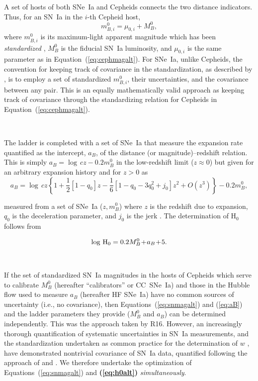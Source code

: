 \documentclass[12pt]{aastex631}
\newcommand{\bq}{\begin{equation}}
\newcommand{\eq}{\end{equation}}
\begin{document}
A set of hosts of both SNe~Ia and Cepheids connects the two distance indicators. Thus, for an SN~Ia in the $i$-th Cepheid host, 
\bq m_{B,i}^0=\mu_{0,i}\!+\!M_B^0, \label{eq:snmagalt} \eq
\noindent where $m_{B,i}^0$ is its maximum-light apparent magnitude which has been {\it standardized} \citep[i.e., corrected for variations around the fiducial color, luminosity, and any host dependence; see][]{Scolnic:2021}, $M_B^0$ is the fiducial SN~Ia luminosity, and $\mu_{0,i}$ is the same parameter as in Equation~(\ref{eq:cephmagalt}).  For SNe~Ia, unlike Cepheids, the convention for keeping track of covariance in the standardization, as described by \cite{Scolnic:2021}, is to employ a set of standardized $m_{B,i}^0$, their uncertainties, and the covariance between any pair.  This is an equally mathematically valid approach as keeping track of covariance through the standardizing relation for Cepheids in Equation~(\ref{eq:cephmagalt}).

\ \par

The ladder is completed with a set of SNe~Ia that measure the expansion rate quantified as the intercept, $a_B$, of the distance (or magnitude)--redshift relation.  This is simply $a_B=\log\,cz - 0.2m_B^0$ in the low-redshift limit ($z \approx 0$) but given for an arbitrary expansion history and for $z>0$ as \bq a_B=\log\,cz \left\{ 1 + {\frac{1}{2}}\left[1-q_0\right] {z} -{\frac{1}{6}}\left[1-q_0-3q_0^2+j_0 \right] z^2 + O(z^3) \right\} - 0.2m_B^0, \label{eq:aB} \eq

\noindent measured from a set of SNe~Ia ($z, m_B^0$) where $z$ is the redshift due to expansion, $q_0$ is the deceleration parameter, and $j_0$ is the jerk \citep[see][for definitions]{Visser:2004}. The determination of H$_0$ follows from

\bq \log\,{\rm H}_0={0.2 M_B^0\!+\!a_B\!+\!5}. \label{eq:h0alt} \eq

\ \par

If the set of standardized SN~Ia magnitudes in the hosts of Cepheids which serve to calibrate $M_B^0$ (hereafter ``calibrators'' or CC~SNe~Ia) and those in the Hubble flow used to measure $a_B$ (hereafter HF SNe~Ia) have no common sources of uncertainty (i.e., no covariance), then Equations~(\ref{eq:snmagalt}) and (\ref{eq:aB}) and the ladder parameters they provide ($M_B^0$ and $a_B$) can be determined independently. This was the approach taken by R16. However, an increasingly thorough quantification of systematic uncertainties in SN~Ia measurements, and the standardization undertaken as common practice for the determination of $w$ \citep{Scolnic:2018}, have demonstrated nontrivial covariance of SN~Ia data, quantified following the approach of \cite{Conley:2011} and \cite{Dhawan:2020}. We therefore undertake the optimization of Equations~(\ref{eq:snmagalt}) and {\bf (\ref{eq:h0alt})} {\it simultaneously}. 
\end{document}
